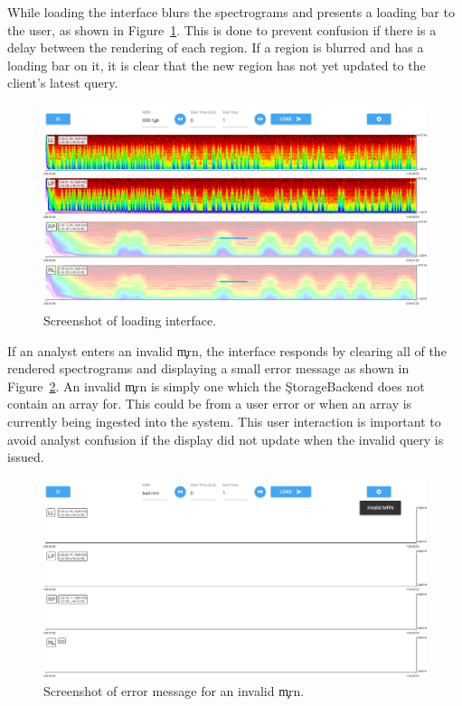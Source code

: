 While loading the interface blurs the spectrograms and presents a loading bar
to the user, as shown in Figure~\ref{fig:loading}. This is done to
prevent confusion if there is a delay between the rendering of each region. If
a region is blurred and has a loading bar on it, it is clear that the new
region has not yet updated to the client's latest query. \\

\begin{figure}[h]
\begin{center}
\includegraphics[scale=0.35]{./img/loading.png}
\caption{Screenshot of loading interface.}
\label{fig:loading}
\end{center}
\end{figure}

If an analyst enters an invalid \c{mrn}, the interface responds by clearing all
of the rendered spectrograms and displaying a small error message as shown in
Figure~\ref{fig:error}. An invalid \c{mrn} is simply one which the
\c{StorageBackend} does not contain an array for. This could be from a user
error or when an array is currently being ingested into the system. This user
interaction is important to avoid analyst confusion if the display did not
update when the invalid query is issued. \\

\begin{figure}[h]
\begin{center}
\includegraphics[scale=0.35]{./img/error.png}
\caption{Screenshot of error message for an invalid \c{mrn}.}
\label{fig:error}
\end{center}
\end{figure}

